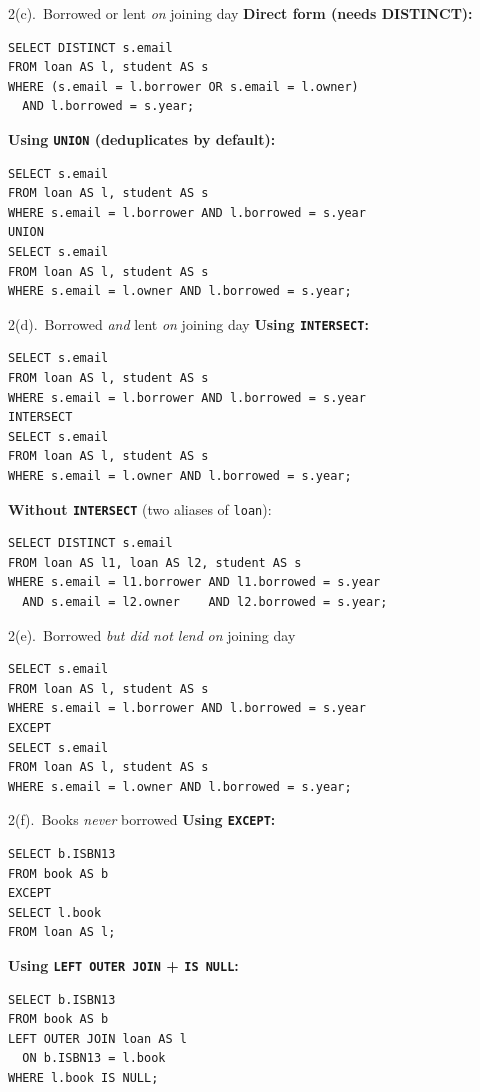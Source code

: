 \documentclass{beamer}
\begin{document}
\begin{frame}[fragile]{2(c).\ Borrowed or lent \emph{on} joining day}
\small
\textbf{Direct form (needs DISTINCT):}
\begin{lstlisting}
SELECT DISTINCT s.email
FROM loan AS l, student AS s
WHERE (s.email = l.borrower OR s.email = l.owner)
  AND l.borrowed = s.year;
\end{lstlisting}
\textbf{Using \texttt{UNION} (deduplicates by default):}
\begin{lstlisting}
SELECT s.email
FROM loan AS l, student AS s
WHERE s.email = l.borrower AND l.borrowed = s.year
UNION
SELECT s.email
FROM loan AS l, student AS s
WHERE s.email = l.owner AND l.borrowed = s.year;
\end{lstlisting}
\end{frame}

\begin{frame}[fragile]{2(d).\ Borrowed \emph{and} lent \emph{on} joining day}
\small
\textbf{Using \texttt{INTERSECT}:}
\begin{lstlisting}
SELECT s.email
FROM loan AS l, student AS s
WHERE s.email = l.borrower AND l.borrowed = s.year
INTERSECT
SELECT s.email
FROM loan AS l, student AS s
WHERE s.email = l.owner AND l.borrowed = s.year;
\end{lstlisting}
\textbf{Without \texttt{INTERSECT}} (two aliases of \texttt{loan}):
\begin{lstlisting}[style=sqlcompact]
SELECT DISTINCT s.email
FROM loan AS l1, loan AS l2, student AS s
WHERE s.email = l1.borrower AND l1.borrowed = s.year
  AND s.email = l2.owner    AND l2.borrowed = s.year;
\end{lstlisting}
\end{frame}

\begin{frame}[fragile]{2(e).\ Borrowed \emph{but did not lend} \emph{on} joining day}
\small
\begin{lstlisting}
SELECT s.email
FROM loan AS l, student AS s
WHERE s.email = l.borrower AND l.borrowed = s.year
EXCEPT
SELECT s.email
FROM loan AS l, student AS s
WHERE s.email = l.owner AND l.borrowed = s.year;
\end{lstlisting}
\end{frame}

\begin{frame}[fragile]{2(f).\ Books \emph{never} borrowed}
\small
\textbf{Using \texttt{EXCEPT}:}
\begin{lstlisting}
SELECT b.ISBN13
FROM book AS b
EXCEPT
SELECT l.book
FROM loan AS l;
\end{lstlisting}
\textbf{Using \texttt{LEFT OUTER JOIN} + \texttt{IS NULL}:}
\begin{lstlisting}
SELECT b.ISBN13
FROM book AS b
LEFT OUTER JOIN loan AS l
  ON b.ISBN13 = l.book
WHERE l.book IS NULL;
\end{lstlisting}
\end{frame}
\end{document}
